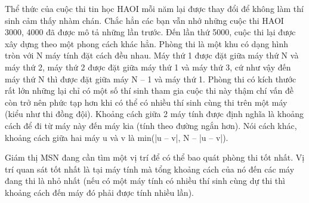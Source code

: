 Thể thức của cuộc thi tin học HAOI mỗi năm lại được thay đổi để không làm thí sinh cảm thấy nhàm chán. Chắc hẳn các bạn vẫn nhớ những cuộc thi HAOI 3000, 4000 đã được mô tả những lần trước. Đến lần thứ 5000, cuộc thi lại được xây dựng theo một phong cách khác hẳn. Phòng thi là một khu có dạng hình tròn với N máy tính đặt cách đều nhau. Máy thứ 1 được đặt giữa máy thứ N và máy thứ 2, máy thứ 2 được đặt giữa máy thứ 1 và máy thứ 3, cứ như vậy đến máy thứ N thì được đặt giữa máy N – 1 và máy thứ 1. Phòng thi có kích thước rất lớn những lại chỉ có một số thí sinh tham gia cuộc thi này thậm chí vấn đề còn trở nên phức tạp hơn khi có thể có nhiều thí sinh cùng thi trên một máy (kiểu như thi đồng đội). Khoảng cách giữa 2 máy tính được định nghĩa là khoảng cách để đi từ máy này đến máy kia (tính theo đường ngắn hơn). Nói cách khác, khoảng cách giữa hai máy u và v là min(|u – v|, N – |u – v|).  

   Giám thị MSN đang cần tìm một vị trí để có thể bao quát phòng thi tốt nhất. Vị trí quan sát tốt nhất là tại máy tính mà tổng khoảng cách của nó đến các máy đang thi là nhỏ nhất (nếu có một máy tính có nhiều thí sinh cùng dự thi thì khoảng cách đến máy đó phải được tính nhiều lần).